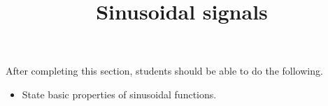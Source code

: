 \documentclass{ximera}
\title{Sinusoidal signals}
\begin{document}
\begin{abstract}
\end{abstract}

\maketitle

\begin{sectionOutcomes}

After completing this section, students should be able to do the following.

\begin{itemize}
\item State basic properties of sinusoidal functions.
\end{itemize}

\end{sectionOutcomes}
\end{document}
